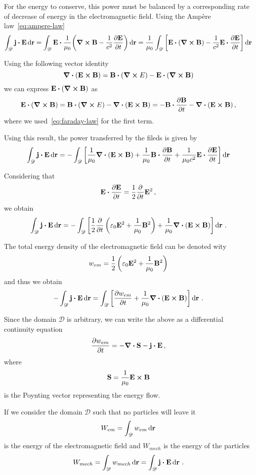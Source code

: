 \documentclass[class=report, crop=false]{standalone}
\begin{document}
For the energy to conserve, this power must be balanced by a corresponding
rate of decrease of energy in the electromagnetic field.
Using the Ampère law~\eqref{eq:ampere-law}
\[
  \int_{\mathscr{D}} \vb{j} \vdot \vb{E} \dd{\vb{r}} =
  \int_{\mathscr{D}} \vb{E} \vdot \frac{1}{\mu_0} \qty(\curl{\vb{B}} - \frac{1}{c^2} \pdv{\vb{E}}{t}) \dd{\vb{r}} =
  \frac{1}{\mu_0} \int_{\mathscr{D}} \left[\vb{E} \vdot(\curl{\vb{B}}) -
    \frac{1}{c^2} \vb{E} \vdot \pdv{\vb{E}}{t} \right] \dd{\vb{r}}
\]

Using the following vector identity
\[
  \div(\vb{E} \cp \vb{B}) = \vb{B} \vdot (\curl{E}) - \vb{E} \vdot (\curl{\vb{B}})
\]
we can express \(\vb{E} \vdot(\curl{\vb{B}})\) as
\[
  \vb{E} \vdot(\curl{\vb{B}}) = \vb{B} \vdot (\curl{E}) - \div(\vb{E} \cp \vb{B}) =
  - \vb{B} \vdot \pdv{\vb{B}}{t} - \div(\vb{E} \cp \vb{B})\,,
\]
where we used~\eqref{eq:faraday-law} for the first term.

Using this result, the power transferred by the fileds is given by
\[
  \int_{\mathscr{D}} \vb{j} \vdot \vb{E} \dd{\vb{r}} =
  -\int_{\mathscr{D}} \left[\frac{1}{\mu_0} \div(\vb{E} \cp \vb{B}) + \frac{1}{\mu_0} \vb{B} \vdot \pdv{\vb{B}}{t} +
    \frac{1}{\mu_0 c^2} \vb{E} \vdot \pdv{\vb{E}}{t} \right] \dd{\vb{r}}
\]

Considering that
\[
  \vb{E} \vdot \pdv{\vb{E}}{t} = \frac{1}{2} \pdv{t} \vb{E}^2\,,
\]
we obtain
\[
  \int_{\mathscr{D}} \vb{j} \vdot \vb{E} \dd{\vb{r}} =
  -\int_{\mathscr{D}} \left[ \frac{1}{2} \pdv{t}
    \left( \varepsilon_0 \vb{E}^2 + \frac{1}{\mu_0}\vb{B}^2 \right)
  + \frac{1}{\mu_0}\div(\vb{E} \cp \vb{B}) \right] \dd{\vb{r}}\,.
\]

The total energy density of the electromagnetic field can be denoted wity
\[
  w_{em} = \frac{1}{2} \left( \varepsilon_0 \vb{E}^2 + \frac{1}{\mu_0}\vb{B}^2 \right)
\]
and thus we obtain
\[
  -\int_{\mathscr{D}} \vb{j} \vdot \vb{E} \dd{\vb{r}} =
  \int_{\mathscr{D}} \left[ \pdv{w_{em}}{t} +
  \frac{1}{\mu_0}\div(\vb{E} \cp \vb{B}) \right] \dd{\vb{r}}\,.
\]

Since the domain \(\mathscr{D}\) is arbitrary, we can write the above as a
differential continuity equation
\begin{equation}
  \label{eq:poynting-theorem-local}
  \pdv{w_{em}}{t} = - \div{\vb{S}} - \vb{j} \vdot \vb{E}\,,
\end{equation}
where
\[
  \vb{S} = \frac{1}{\mu_0} \vb{E} \cp \vb{B}
\]
is the Poynting vector representing the energy flow.

If we consider the domain \(\mathscr{D}\) such that no particles will leave it
\[
  W_{em} = \int_{\mathscr{D}} w_{em} \dd{\vb{r}}
\]
is the energy of the electromagnetic field and \(W_{mech}\) is the
energy of the particles
\[
  W_{mech} = \int_{\mathscr{D}} w_{mech} \dd{\vb{r}} =
  \int_{\mathscr{D}} \vb{j} \vdot \vb{E} \dd{\vb{r}}\,.
\]
\end{document}
